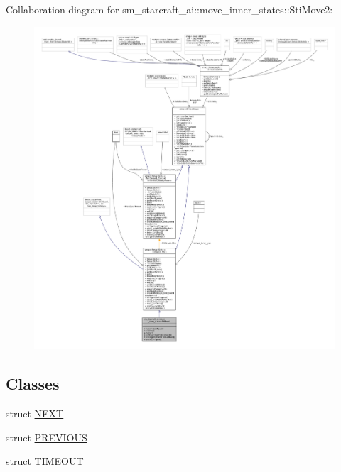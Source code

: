 Collaboration diagram for sm\+\_\+starcraft\+\_\+ai\+:\+:move\+\_\+inner\+\_\+states\+:\+:Sti\+Move2\+:
\nopagebreak
\begin{figure}[H]
\begin{center}
\leavevmode
\includegraphics[width=350pt]{structsm__starcraft__ai_1_1move__inner__states_1_1StiMove2__coll__graph}
\end{center}
\end{figure}
\subsection*{Classes}
\begin{DoxyCompactItemize}
\item 
struct \hyperlink{structsm__starcraft__ai_1_1move__inner__states_1_1StiMove2_1_1NEXT}{N\+E\+XT}
\item 
struct \hyperlink{structsm__starcraft__ai_1_1move__inner__states_1_1StiMove2_1_1PREVIOUS}{P\+R\+E\+V\+I\+O\+US}
\item 
struct \hyperlink{structsm__starcraft__ai_1_1move__inner__states_1_1StiMove2_1_1TIMEOUT}{T\+I\+M\+E\+O\+UT}
\end{DoxyCompactItemize}
